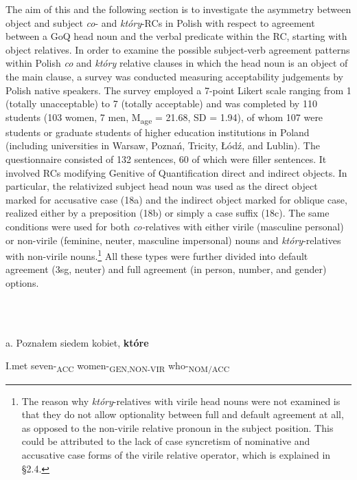 \documentclass[output=paper]{langsci/langscibook}
\begin{document}
\begin{styleListParagraph}
The aim of this and the following section is to investigate the asymmetry between object and subject \textit{co}{}- and \textit{który}{}-RCs in Polish with respect to agreement between a GoQ head noun and the verbal predicate within the RC, starting with object relatives. In order to examine the possible subject-verb agreement patterns within Polish \textit{co} and \textit{który} relative clauses in which the head noun is an object of the main clause, a survey was conducted measuring acceptability judgements by Polish native speakers. The survey employed a 7-point Likert scale ranging from 1 (totally unacceptable) to 7 (totally acceptable) and was completed by 110 students (103 women, 7 men, M\textsubscript{age} = 21.68, SD = 1.94), of whom 107 were students or graduate students of higher education institutions in Poland (including universities in Warsaw, Poznań, Tricity, Łódź, and Lublin). The questionnaire consisted of 132 sentences, 60 of which were filler sentences. It involved RCs modifying Genitive of Quantification direct and indirect objects. In particular, the relativized subject head noun was used as the direct object marked for accusative case (18a) and the indirect object marked for oblique case, realized either by a preposition (18b) or simply a case suffix (18c). The same conditions were used for both \textit{co-}relatives with either virile (masculine personal) or non-virile (feminine, neuter, masculine impersonal) nouns and \textit{który}{}-relatives with non-virile nouns.\footnote{The reason why \textit{który}{}-relatives with virile head nouns were not examined is that they do not allow optionality between full and default agreement at all, as opposed to the non-virile relative pronoun in the subject position. This could be attributed to the lack of case syncretism of nominative and accusative case forms of the virile relative operator, which is explained in §2.4.} All these types were further divided into default agreement (3sg, neuter) and full agreement (in person, number, and gender) options.
\end{styleListParagraph}

\ea%
    \label{ex:key:18}
    \gll\\
        \\
    \glt
    \z

          a.   Poznałem   siedem   kobiet,   \textbf{które}     

    I.met   seven-\textsubscript{ACC}   women-\textsubscript{GEN,NON-VIR}  who-\textsubscript{NOM/ACC} 
\end{document}
